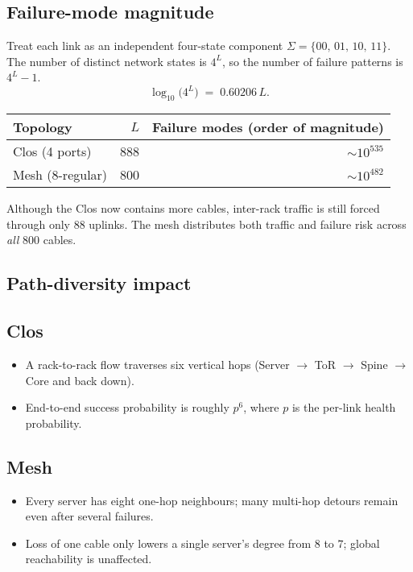 \documentclass[../../../OAE-SPEC-MAIN.tex]{subfiles}
\begin{document}
\subsection{Failure-mode magnitude}
Treat each link as an independent four-state component
$\Sigma = \{00,\,01,\,10,\,11\}$.  The number of distinct network
states is $4^{L}$, so the number of failure patterns is $4^{L}-1$.
\[
\log_{10}\!\bigl(4^{L}\bigr) \;=\; 0.60206\,L.
\]
\begin{center}
\begin{tabular}{@{}lrr@{}}
\toprule
Topology & $L$ & Failure modes (order of magnitude)\\
\midrule
Clos (4 ports) & 888 & $\sim 10^{535}$\\
Mesh ($8$-regular) & 800 & $\sim 10^{482}$\\
\bottomrule
\end{tabular}
\end{center}
Although the Clos now contains more cables, inter-rack traffic is still
forced through only 88 uplinks.  The mesh distributes both traffic and
failure risk across \emph{all} 800 cables.
\subsection{Path-diversity impact}
\subsection*{Clos}
\begin{itemize}
  \item A rack-to-rack flow traverses six vertical hops
        (Server $\rightarrow$ ToR $\rightarrow$ Spine $\rightarrow$
        Core and back down).
  \item End-to-end success probability is roughly $p^{6}$, where
        $p$ is the per-link health probability.
\end{itemize}
\subsection*{Mesh}
\begin{itemize}
  \item Every server has eight one-hop neighbours; many multi-hop
        detours remain even after several failures.
  \item Loss of one cable only lowers a single server's degree
        from $8$ to $7$; global reachability is unaffected.
\end{itemize}
\end{document}
